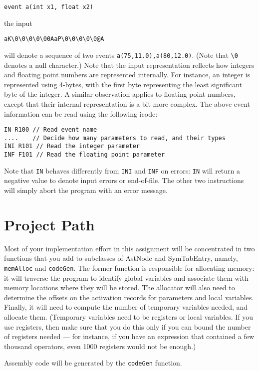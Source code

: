 \documentclass{article}
\begin{document}
\begin{verbatim}
event a(int x1, float x2)
\end{verbatim}

the input
\begin{verbatim}
aK\0\0\0\0\00AaP\0\0\0\0\0@A
\end{verbatim}
will denote a sequence of two events \verb+a(75,11.0),a(80,12.0)+. (Note
that \verb+\0+ denotes a null character.) Note that the input
representation reflects how integers and floating point numbers are
represented internally. For instance, an integer is represented using
4-bytes, with the first byte representing the least significant byte of
the integer. A similar observation applies to floating point numbers,
except that their internal representation is a bit more complex. The above
event information can be read using the following icode:

\begin{verbatim}
IN R100 // Read event name
....    // Decide how many parameters to read, and their types
INI R101 // Read the integer parameter
INF F101 // Read the floating point parameter
\end{verbatim}

Note that \verb+IN+ behaves differently from \verb+INI+ and \verb+INF+ 
on errors: \verb+IN+ will return a negative value to denote input
errors or end-of-file. The other two instructions will simply abort the
program with an error message.
%
\section{Project Path}
%
Most of your implementation effort in this assignment will be concentrated
in two functions that you add to subclasses of AstNode and SymTabEntry,
namely, \verb+memAlloc+ and \verb+codeGen+. The former function is
responsible for allocating memory: it will traverse the program to identify
global variables and associate them with memory locations where they will
be stored. The allocator will also need to determine the offsets on
the activation records for parameters and local variables. Finally,
it will need to compute the number of temporary variables needed,
and allocate them. (Temporary variables need to be registers or local
variables. If you use registers, then make sure that you do this only
if you can bound the number of registers needed --- for instance, if you
have an expression that contained a few thousand operators, even 1000
registers would not be enough.)

Assembly code will be generated by the \verb+codeGen+ function.
\end{document}
